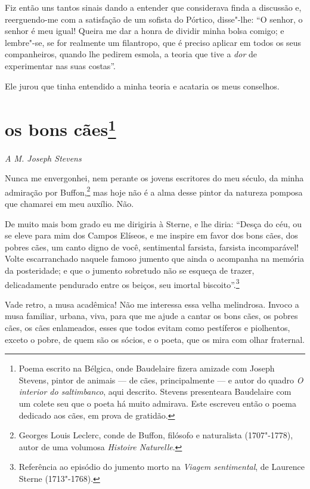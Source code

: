 Fiz então uns tantos sinais dando a entender que considerava
finda a discussão e, reerguendo-me com a satisfação de um sofista do
Pórtico, disse"-lhe: “O senhor, o senhor é meu igual!
Queira me dar a honra de dividir minha bolsa comigo; e lembre"-se, se for
realmente um filantropo, que é preciso aplicar em todos
os seus companheiros, quando lhe pedirem esmola, a teoria que tive a
\textit{dor} de experimentar nas suas costas''.

Ele jurou que tinha entendido a minha teoria e acataria os meus
conselhos.

\quebra\section[Os bons cães]{os bons cães\protect\footnote{ Poema escrito na Bélgica, 
onde Baudelaire fizera amizade com Joseph
Stevens, pintor de animais --- de cães, principalmente --- e autor do quadro {\itshape O
interior do saltimbanco}, aqui descrito. Stevens presenteara Baudelaire
com um colete seu que o poeta há muito admirava. Este escreveu então o
poema dedicado aos cães, em prova de gratidão.}}

\begin{flushright}
\textit{A M. Joseph Stevens} 
\end{flushright}

Nunca me envergonhei, nem perante os jovens escritores do meu século,
da minha admiração por Buffon,\protect\footnote{ Georges Louis Leclerc, 
conde de Buffon, filósofo e naturalista
(1707"-1778), autor de uma volumosa \textit{Histoire Naturelle}.}
mas hoje não é a alma
desse pintor da natureza pomposa que chamarei em meu auxílio. Não.

De muito mais bom grado eu me dirigiria à Sterne, e lhe diria:
“Desça do céu, ou se eleve para mim dos Campos Elíseos, e me inspire em favor dos bons cães, dos pobres cães, um
canto digno de você, sentimental farsista, farsista incomparável! Volte
escarranchado naquele famoso jumento que ainda o acompanha na memória
da posteridade; e que o jumento sobretudo não se esqueça de trazer,
delicadamente pendurado entre os beiços, seu imortal
biscoito''.\protect\footnote{ Referência ao episódio do jumento morto na \textit{Viagem sentimental},
de Laurence Sterne (1713"-1768).}

Vade retro, a musa acadêmica! Não me interessa essa velha melindrosa.
Invoco a musa familiar, urbana, viva, para que me ajude a
cantar os bons cães, os pobres cães, os cães enlameados, esses que
todos evitam como pestíferos e piolhentos, exceto o pobre, de quem são
os sócios, e o poeta, que os mira com olhar fraternal.

